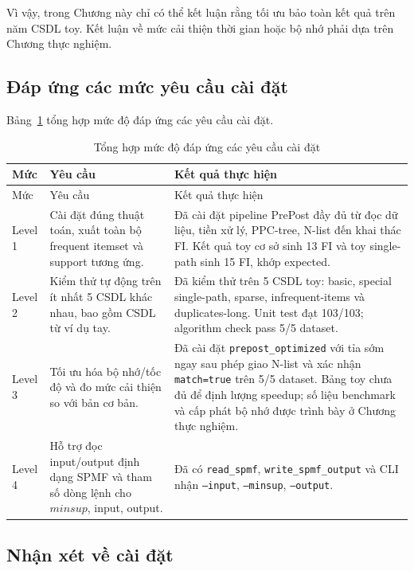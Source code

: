 Vì vậy, trong Chương này chỉ có thể kết luận rằng tối ưu bảo toàn kết quả trên
năm CSDL toy. Kết luận về mức cải thiện thời gian hoặc bộ nhớ phải dựa trên
Chương thực nghiệm.

\subsection{Đáp ứng các mức yêu cầu cài đặt}
\label{subsec:implementation-level-summary}

Bảng~\ref{tab:implementation-level-summary} tổng hợp mức độ đáp ứng các yêu cầu cài đặt.

\begin{longtable}{p{}p{}p{}}
\caption{Tổng hợp mức độ đáp ứng các yêu cầu cài đặt}
\label{tab:implementation-level-summary}\\
\toprule
Mức & Yêu cầu & Kết quả thực hiện \\
\midrule
\endfirsthead
\toprule
Mức & Yêu cầu & Kết quả thực hiện \\
\midrule
\endhead
Level 1 & Cài đặt đúng thuật toán, xuất toàn bộ frequent itemset và support tương ứng. & Đã cài đặt pipeline PrePost đầy đủ từ đọc dữ liệu, tiền xử lý, PPC-tree, N-list đến khai thác FI. Kết quả toy cơ sở sinh 13 FI và toy single-path sinh 15 FI, khớp expected. \\
Level 2 & Kiểm thử tự động trên ít nhất 5 CSDL khác nhau, bao gồm CSDL từ ví dụ tay. & Đã kiểm thử trên 5 CSDL toy: basic, special single-path, sparse, infrequent-items và duplicates-long. Unit test đạt 103/103; algorithm check pass 5/5 dataset. \\
Level 3 & Tối ưu hóa bộ nhớ/tốc độ và đo mức cải thiện so với bản cơ bản. &
Đã cài đặt \texttt{prepost\_optimized} với tỉa sớm ngay sau phép giao N-list và
xác nhận \texttt{match=true} trên 5/5 dataset. Bảng toy chưa đủ để định lượng
speedup; số liệu benchmark và cấp phát bộ nhớ được trình bày ở Chương thực
nghiệm. \\
Level 4 & Hỗ trợ đọc input/output định dạng SPMF và tham số dòng lệnh cho $\mathit{minsup}$, input, output. & Đã có \texttt{read\_spmf}, \texttt{write\_spmf\_output} và CLI nhận \texttt{--input}, \texttt{--minsup}, \texttt{--output}. \\
\bottomrule
\end{longtable}

\subsection{Nhận xét về cài đặt}
\label{subsec:implementation-discussion}

